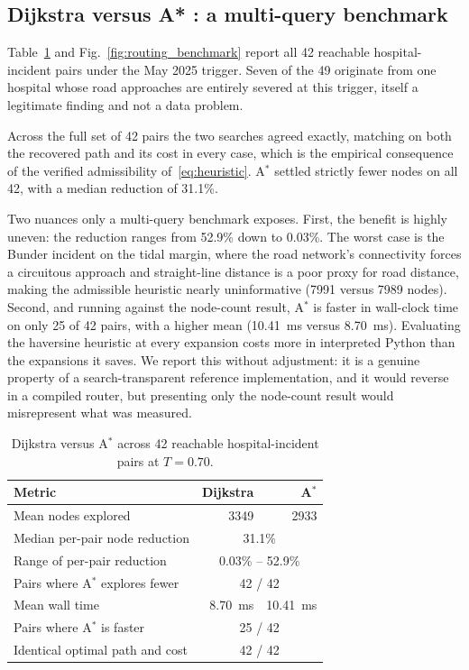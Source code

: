 \documentclass[10pt,twocolumn]{article}
\begin{document}
\subsection{Dijkstra versus A* : a multi-query benchmark}
\label{sec:res-algo}

Table~\ref{tab:algo} and Fig.~\ref{fig:routing_benchmark} report all 42
reachable hospital-incident pairs under the May 2025 trigger. Seven of the 49
originate from one hospital whose road approaches are entirely severed at this
trigger, itself a legitimate finding and not a data problem.

Across the full set of 42 pairs the two searches agreed exactly, matching on both
the recovered path and its cost in every case, which is the empirical consequence
of the verified admissibility of~\eqref{eq:heuristic}. A$^\ast$ settled
strictly fewer nodes on all 42, with a median reduction of 31.1\%.

Two nuances only a multi-query benchmark exposes. First, the benefit is highly
uneven: the reduction ranges from 52.9\% down to 0.03\%. The worst case is the
Bunder incident on the tidal margin, where the road network's connectivity forces
a circuitous approach and straight-line distance is a poor proxy for road
distance, making the admissible heuristic nearly uninformative (\num{7991} versus
\num{7989} nodes). Second, and running against the node-count result, A$^\ast$ is
faster in wall-clock time on only 25 of 42 pairs, with a higher mean
(\SI{10.41}{\milli\second} versus \SI{8.70}{\milli\second}). Evaluating the
haversine heuristic at every expansion costs more in interpreted Python than the
expansions it saves. We report this without adjustment: it is a genuine property
of a search-transparent reference implementation, and it would reverse in a
compiled router, but presenting only the node-count result would misrepresent
what was measured.

\begin{table}[!t]
\centering\footnotesize
\caption{Dijkstra versus A$^\ast$ across 42 reachable hospital-incident pairs at
$T=0.70$.}
\label{tab:algo}
\small
\begin{tabular}{@{}lrr@{}}
\toprule
\textbf{Metric} & \textbf{Dijkstra} & \textbf{A}$^\ast$ \\
\midrule
Mean nodes explored & \num{3349} & \num{2933} \\
Median per-pair node reduction & \multicolumn{2}{c}{31.1\%} \\
Range of per-pair reduction & \multicolumn{2}{c}{0.03\% -- 52.9\%} \\
Pairs where A$^\ast$ explores fewer & \multicolumn{2}{c}{42 / 42} \\
Mean wall time & \SI{8.70}{\milli\second} & \SI{10.41}{\milli\second} \\
Pairs where A$^\ast$ is faster & \multicolumn{2}{c}{25 / 42} \\
Identical optimal path and cost & \multicolumn{2}{c}{42 / 42} \\
\bottomrule
\end{tabular}
\end{table}
\end{document}
